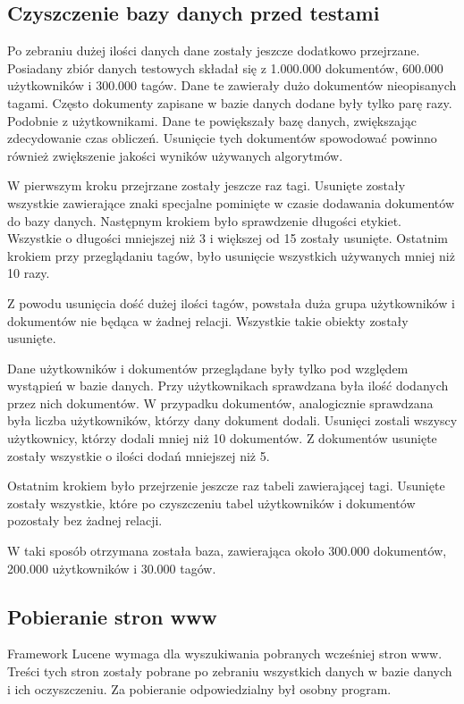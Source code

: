 \subsection{Czyszczenie bazy danych przed testami}


Po zebraniu dużej ilości danych dane zostały jeszcze dodatkowo przejrzane. Posiadany zbiór danych testowych składał się z 1.000.000 dokumentów, 600.000 użytkowników i 300.000 tagów. Dane te zawierały dużo dokumentów nieopisanych tagami. Często dokumenty zapisane w bazie danych dodane były tylko parę razy. Podobnie z użytkownikami. Dane te powiększały bazę danych, zwiększając zdecydowanie czas obliczeń. Usunięcie tych dokumentów spowodować powinno również zwiększenie jakości wyników używanych algorytmów.

W pierwszym kroku przejrzane zostały jeszcze raz tagi. Usunięte zostały wszystkie zawierające znaki specjalne pominięte w czasie dodawania dokumentów do bazy danych. Następnym krokiem było sprawdzenie długości etykiet. Wszystkie o długości mniejszej niż 3 i większej od 15 zostały usunięte. Ostatnim krokiem przy przeglądaniu tagów, było usunięcie wszystkich używanych mniej niż 10 razy.


Z powodu usunięcia dość dużej ilości tagów, powstała duża grupa użytkowników i dokumentów nie będąca w żadnej relacji. Wszystkie takie obiekty zostały usunięte.

Dane użytkowników i dokumentów przeglądane były tylko pod względem wystąpień w bazie danych. Przy użytkownikach sprawdzana była ilość dodanych przez nich dokumentów. W przypadku dokumentów, analogicznie sprawdzana była liczba użytkowników, którzy dany dokument dodali. Usunięci zostali wszyscy użytkownicy, którzy dodali mniej niż 10 dokumentów. Z dokumentów usunięte zostały wszystkie o ilości dodań mniejszej niż 5.

Ostatnim krokiem było przejrzenie jeszcze raz tabeli zawierającej tagi. Usunięte zostały wszystkie, które po czyszczeniu tabel użytkowników i dokumentów pozostały bez żadnej relacji. 

W taki sposób otrzymana została baza, zawierająca około 300.000 dokumentów, 200.000 użytkowników i 30.000 tagów. 




\subsection{Pobieranie stron www}


Framework Lucene wymaga dla wyszukiwania pobranych wcześniej stron www. Treści tych stron zostały pobrane po zebraniu wszystkich danych w bazie danych i ich oczyszczeniu. Za pobieranie odpowiedzialny był osobny program.

